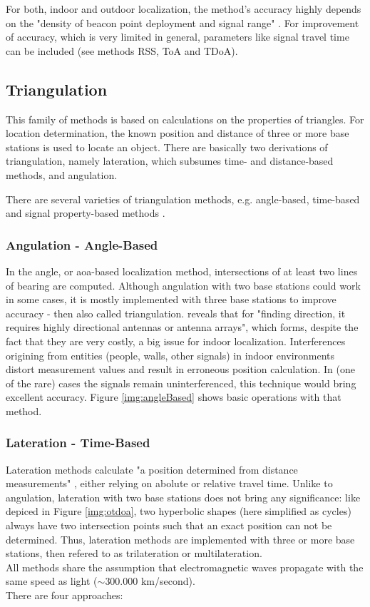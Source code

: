 For both, indoor and outdoor localization, the method's accuracy highly depends on the "density of beacon point deployment and signal range" \cite[p. 3]{wirelessILSystemsAndTechniques}. For improvement of accuracy, which is very limited in general, parameters like signal travel time can be included (see methods RSS, ToA and TDoA).

\subsection*{Triangulation}

This family of methods is based on calculations on the properties of triangles. For location determination, the known position and distance of three or more base stations is used to locate an object. There are basically two derivations of triangulation, namely lateration, which subsumes time- and distance-based methods, and angulation.

There are several varieties of triangulation methods, e.g. angle-based, time-based and signal property-based methods \cite{recentAdvances}. 

\subsubsection{Angulation - Angle-Based} 
In the angle, or \ac{aoa}-based localization method, intersections of at least two lines of bearing are computed. Although angulation with two base stations could work in some cases, it is mostly implemented with three base stations to improve accuracy - then also called triangulation. \cite{recentAdvances} reveals that for "finding direction, it requires highly directional antennas or antenna arrays", which forms, despite the fact that they are very costly, a big issue for indoor localization. Interferences origining from entities (people, walls, other signals) in indoor environments distort measurement values and result in erroneous position calculation. In (one of the rare) cases the signals remain uninterferenced, this technique would bring excellent accuracy.
Figure \ref{img:angleBased} shows basic operations with that method.

\subsubsection{Lateration - Time-Based}
Lateration methods calculate "a position determined from distance measurements" \cite{recentAdvances}, either relying on abolute or relative travel time. Unlike to angulation, lateration with two base stations does not bring any significance: like depiced in Figure \ref{img:otdoa}, two hyperbolic shapes (here simplified as cycles) always have two intersection points such that an exact position can not be determined. Thus, lateration methods are implemented with three or more base stations, then refered to as trilateration or multilateration. \\
All methods share the assumption that electromagnetic waves propagate with the same speed as light ($\sim$300.000 km/second).\\
There are four approaches:

